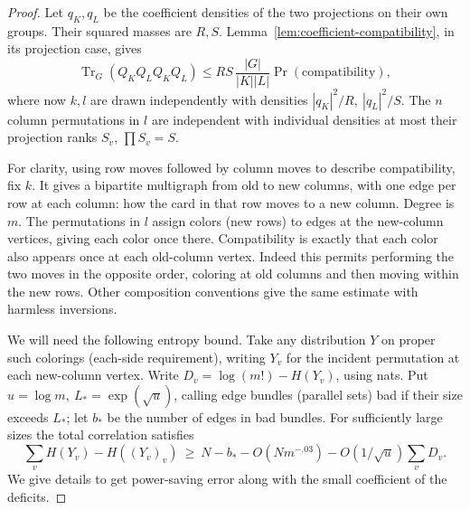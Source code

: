 \begin{proof}\label{tra:regular-ranks:crossing-proof}
\label{tra:regular-ranks:conditional-coloring-proof}
Let $q_K,q_L$ be the coefficient densities of the two projections
on their own groups. Their squared masses are $R,S$.
Lemma~\ref{lem:coefficient-compatibility}, in its projection case,
gives
\begin{equation}
 \operatorname{Tr}_{G}(Q_K Q_L Q_K Q_L)
       \le R S\,\frac{|G|}{|K||L|}\Pr(\text{compatibility}),\label{tra:regular-ranks:eq5}
\end{equation}
where now \(k,l\) are drawn independently with densities \(|q_K|^2/R,\ |q_L|^2/S\). The \(n\) column permutations in \(l\) are independent with individual densities at most their projection ranks \(S_v\), \(\prod S_v=S\).

For clarity, using row moves followed by column moves to describe compatibility, fix \(k\). It gives a bipartite multigraph from old to new columns, with one edge per row at each column: how the card in that row moves to a new column. Degree is \(m\). The permutations in \(l\) assign colors (new rows) to edges at the new-column vertices, giving each color once there. Compatibility is exactly that each color also appears once at each old-column vertex. Indeed this permits performing the two moves in the opposite order, coloring at old columns and then moving within the new rows. Other composition conventions give the same estimate with harmless inversions.

We will need the following entropy bound. Take any distribution \(Y\) on proper such colorings (each-side requirement), writing \(Y_v\) for the incident permutation at each new-column vertex. Write \(D_v=\log(m!)-H(Y_v)\), using nats. Put \(u=\log m,\ L_*=\exp(\sqrt{u})\), calling edge bundles (parallel sets) bad if their size exceeds \(L_*\); let \(b_*\) be the number of edges in bad bundles. For sufficiently large sizes the total correlation satisfies
\begin{equation}
 \sum_v H(Y_v)-H((Y_v)_v)
   \ \ge\ N-b_*-O(Nm^{-.03})
                     - O(1/\sqrt{u})\sum_v D_v .\label{tra:regular-ranks:eq6}
\end{equation}
We give details to get power-saving error along with the small coefficient of the deficits.


\end{proof}
